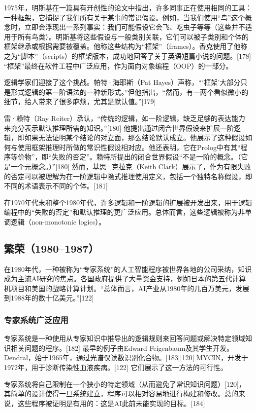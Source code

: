 1975年，明斯基在一篇具有开创性的论文中指出，许多同事正在使用相同的工具：一种框架，它捕捉了我们所有关于某事的常识假设。例如，当我们使用“鸟”这个概念时，立即会浮现出一系列事实：我们可能假设它会飞、吃虫子等等（这些并不适用于所有鸟类）。明斯基将这些假设与一般类别关联，它们可以被子类别和个体的框架继承或根据需要被覆盖。他称这些结构为“框架”（frames）。香克使用了他称之为“脚本”（scripts）的框架版本，成功地回答了关于英语短篇小说的问题。[178] “框架”最终在软件工程中广泛应用，作为面向对象编程（OOP）的一部分。

逻辑学家们迎接了这个挑战。帕特·海耶斯（Pat Hayes）声称，“‘框架’大部分只是形式逻辑的第一阶语法的一种新形式。”但他指出，“然而，有一两个看似微小的细节，给人带来了很多麻烦，尤其是默认值。”[179]

雷·赖特（Ray Reiter）承认，“传统的逻辑，如一阶逻辑，缺乏足够的表达能力来充分表示默认推理所需的知识。”[180] 他提出通过闭合世界假设来扩展一阶逻辑，即如果无法证明某个结论的对立面，那么结论默认成立。他展示了这种假设如何与使用框架推理时所做的常识性假设相对应。他还表明，它在Prolog中有其“程序等价物”，即“失败的否定”。赖特所提出的闭合世界假设“不是一阶的概念。（它是一个元概念。）”[180] 然而，基思·克拉克（Keith Clark）展示了，作为有限失败的否定可以被理解为在一阶逻辑中隐式推理使用定义，包括一个独特名称假设，即不同的术语表示不同的个体。[181]

在1970年代末和整个1980年代，许多逻辑和一阶逻辑的扩展被开发出来，用于逻辑编程中的“失败的否定”和默认推理的更广泛应用。总体而言，这些逻辑被称为非单调逻辑（non-monotonic logics）。
\subsection{繁荣（1980–1987）}
在1980年代，一种被称为“专家系统”的人工智能程序被世界各地的公司采纳，知识成为主流AI研究的焦点。各国政府提供了大量资金支持，例如日本的第五代计算机项目和美国的战略计算计划。“总体而言，AI产业从1980年的几百万美元，发展到1988年的数十亿美元。”[122]
\subsubsection{专家系统广泛应用}
专家系统是一种使用从专家知识中推导出的逻辑规则来回答问题或解决特定领域知识相关问题的程序。[182] 最早的例子由Edward Feigenbaum及其学生开发。Dendral，始于1965年，通过光谱仪读数识别化合物。[183][120] MYCIN，开发于1972年，用于诊断传染性血液疾病。[122] 它们展示了这一方法的可行性。

专家系统将自己限制在一个狭小的特定领域（从而避免了常识知识问题）[120]，其简单的设计使得一旦系统建立，程序可以相对容易地进行构建和修改。总的来说，这些程序被证明是有用的：这是AI此前未能实现的目标。[184]

